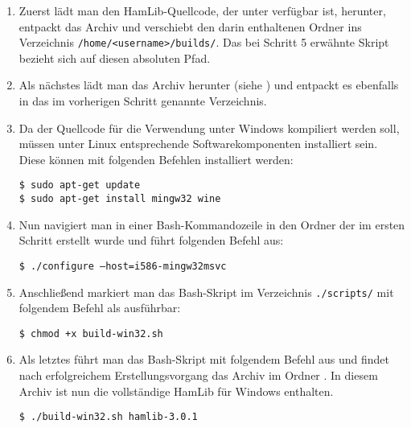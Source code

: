 \begin{enumerate}
	\parskip0pt
	\item Zuerst lädt man den HamLib-Quellcode, der unter \cite{hamlibdownload} verfügbar ist, herunter, entpackt das Archiv  und verschiebt den darin enthaltenen Ordner  ins Verzeichnis \texttt{/home/<username>/builds/}. Das bei Schritt 5 erwähnte Skript bezieht sich auf diesen absoluten Pfad.
	\item Als nächstes lädt man das Archiv  herunter (siehe \cite{libusbdownload}) und entpackt es ebenfalls in das im vorherigen Schritt genannte Verzeichnis.
	\item Da der Quellcode für die Verwendung unter Windows kompiliert werden soll, müssen unter Linux entsprechende Softwarekomponenten installiert sein. Diese können mit folgenden Befehlen installiert werden:
	\vspace{-1em}
	\begin{shaded}
		\texttt{\$ sudo apt-get update}\\[-0.5em]
		\texttt{\$ sudo apt-get install mingw32 wine}
	\end{shaded}
	\vspace{-1em}	
	\item Nun navigiert man in einer Bash-Kommandozeile in den Ordner  der im ersten Schritt erstellt wurde und führt folgenden Befehl aus:
	\vspace{-1em}
	\begin{shaded}
		\texttt{\$ ./configure --host=i586-mingw32msvc}
	\end{shaded}
	\vspace{-1em}
	\item Anschließend markiert man das Bash-Skript  im Verzeichnis \texttt{./scripts/} mit folgendem Befehl als ausführbar:
	\vspace{-1em}
	\begin{shaded}
		\texttt{\$ chmod +x build-win32.sh}
	\end{shaded}
	\vspace{-1em}	
	\item Als letztes führt man das Bash-Skript  mit folgendem Befehl aus und findet nach erfolgreichem Erstellungsvorgang das Archiv  im Ordner . In diesem Archiv ist nun die vollständige HamLib für Windows enthalten.
	\vspace{-1em}
	\begin{shaded}
		\texttt{\$ ./build-win32.sh hamlib-3.0.1}
	\end{shaded}
	\vspace{-1em}	
\end{enumerate}

